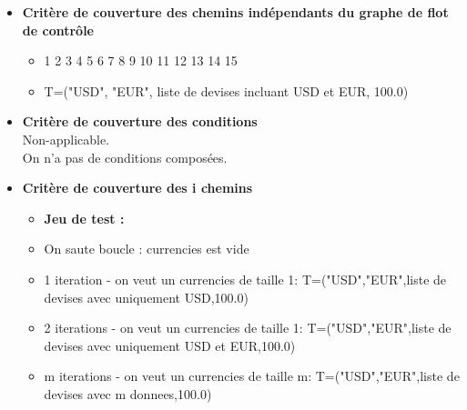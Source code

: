 \documentclass[letterpaper, 10pt]{article}
\begin{document}
\begin{itemize}
\begin{center}
\end{center}

\item\textbf{Critère de couverture des chemins indépendants du graphe de flot de contrôle}
\begin{itemize}
    \item 1 2 3 4 5 6 7 8 9 10 11 12 13 14 15
    \item T={("USD", "EUR", liste de devises incluant USD et EUR, 100.0)}
\end{itemize}

\item \textbf{Critère de couverture des conditions}\\
Non-applicable.\\ On n'a pas de conditions composées.

\item \textbf{Critère de couverture des i chemins}
 \begin{itemize}
    \item \textbf{Jeu de test :}
      
            \item On saute boucle : currencies est vide
            \item 1 iteration - on veut un currencies de taille 1: T={("USD","EUR",liste de devises avec uniquement USD,100.0)}
            \item 2 iterations - on veut un currencies de taille 1: T={("USD","EUR",liste de devises avec uniquement USD et EUR,100.0)}
            \item m iterations - on veut un currencies de taille m: T={("USD","EUR",liste de devises avec m donnees,100.0)}
            
        \end{itemize}
\end{itemize}
\end{document}
